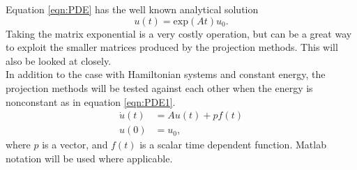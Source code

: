 Equation \eqref{eqn:PDE} has the well known analytical solution 
\begin{equation*}
u(t) = \text{exp}(At)u_0.
\end{equation*}
Taking the matrix exponential is a very costly operation, but can be a great way to exploit the smaller matrices produced by the projection methods. This will also be looked at closely.\\
In addition to the case with Hamiltonian systems and constant energy, the projection methods will be tested against each other when the energy is nonconstant as in equation \eqref{eqn:PDE1}.
\begin{equation}
\begin{aligned}
\dot{u}(t) &= A u(t) + p f(t)\\
u(0)&= u_0,
\end{aligned}
\label{eqn:PDE1}
\end{equation}
where $p$ is a vector, and $f(t)$ is a scalar time dependent function.
Matlab notation will be used where applicable.\\

